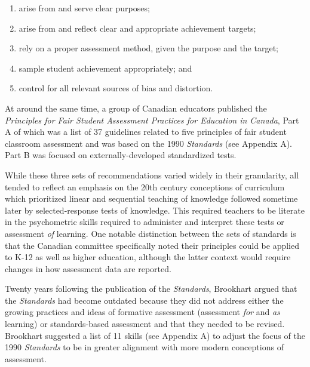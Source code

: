 \documentclass[
]{book}
\providecommand{\tightlist}{%
  \setlength{\itemsep}{0pt}\setlength{\parskip}{0pt}}
\begin{document}
\begin{enumerate}
\def\labelenumi{\arabic{enumi}.}
\tightlist
\item
  arise from and serve clear purposes;
\item
  arise from and reflect clear and appropriate achievement targets;
\item
  rely on a proper assessment method, given the purpose and the target;
\item
  sample student achievement appropriately; and
\item
  control for all relevant sources of bias and distortion. \citeyearpar[p.~240]{stigginsAssessmentLiteracy21st1995}
\end{enumerate}

At around the same time, a group of Canadian educators published the \emph{Principles for Fair Student Assessment Practices for Education in Canada}, Part A of which was a list of 37 guidelines related to five principles of fair student classroom assessment and was based on the 1990 \emph{Standards} (see Appendix A). Part B was focused on externally-developed standardized tests.

While these three sets of recommendations varied widely in their granularity, all tended to reflect an emphasis on the 20th century conceptions of curriculum which prioritized linear and sequential teaching of knowledge followed sometime later by selected-response tests of knowledge. This required teachers to be literate in the psychometric skills required to administer and interpret these tests \citep{delucaTeacherAssessmentLiteracy2016, shepardRoleAssessmentLearning2000, xuTeacherAssessmentLiteracy2016} or assessment \emph{of} learning. One notable distinction between the sets of standards is that the Canadian committee specifically noted their principles could be applied to K-12 as well as higher education, although the latter context would require changes in how assessment data are reported.

Twenty years following the publication of the \emph{Standards}, Brookhart \citeyearpar{brookhartEducationalAssessmentKnowledge2011} argued that the \emph{Standards} had become outdated because they did not address either the growing practices and ideas of formative assessment (assessment \emph{for} and \emph{as} learning) or standards-based assessment and that they needed to be revised. Brookhart suggested a list of 11 skills (see Appendix A) to adjust the focus of the 1990 \emph{Standards} to be in greater alignment with more modern conceptions of assessment.
\end{document}
